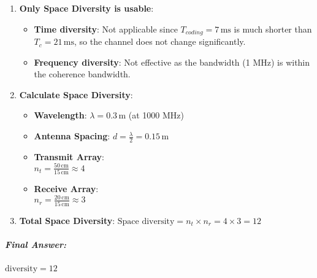\documentclass[11pt]{article}
\providecommand{\tightlist}{%
      \setlength{\itemsep}{0pt}\setlength{\parskip}{0pt}}
\begin{document}
\begin{enumerate}
\def\labelenumi{\arabic{enumi}.}
\tightlist
\item
  \textbf{Only Space Diversity is usable}:

  \begin{itemize}
  \tightlist
  \item
    \textbf{Time diversity}: Not applicable since
    \(T_{coding} = 7 \, \text{ms}\) is much shorter than
    \(T_c = 21 \, \text{ms}\), so the channel does not change
    significantly.
  \item
    \textbf{Frequency diversity}: Not effective as the bandwidth (1 MHz)
    is within the coherence bandwidth.
  \end{itemize}
\item
  \textbf{Calculate Space Diversity}:

  \begin{itemize}
  \tightlist
  \item
    \textbf{Wavelength}: \(\lambda = 0.3 \, \text{m}\) (at 1000 MHz)
  \item
    \textbf{Antenna Spacing}:
    \(d = \frac{\lambda}{2} = 0.15 \, \text{m}\)
  \item
    \textbf{Transmit Array}:\\
    \(n_t = \frac{50 \, \text{cm}}{15 \, \text{cm}} \approx 4\)
  \item
    \textbf{Receive Array}:\\
    \(n_r = \frac{20 \, \text{cm}}{15 \, \text{cm}} \approx 3\)
  \end{itemize}
\item
  \textbf{Total Space Diversity}:
  \(\text{Space diversity} = n_t \times n_r = 4 \times 3 = 12\)
\end{enumerate}

\subparagraph{\texorpdfstring{\textbf{Final
Answer}:}{Final Answer:}}\label{final-answer}

\(\boxed{\text{diversity} = 12}\)


    
    
    
\end{document}
